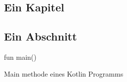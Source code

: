 \documentclass[
    a4paper,
    12pt,
]{report}
\begin{document}
    

    \begin{abstract}
        \blindtext
    \end{abstract}

    

    \begin{spacing}{1.2}
        \chapter{Ein Kapitel}
        \blindtext[2]
        \section{Ein Abschnitt}
        \blindtext[2]

        \begin{listing}
            \begin{kotlincode}
                fun main() {

                }
            \end{kotlincode}
            
            \caption{Main methode eines Kotlin Programms}
            \label{alg:kotlin_main}
        \end{listing}
    \end{spacing}

    \newpage

    \printbibliography
\end{document}
